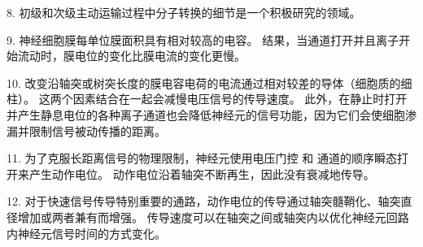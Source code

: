 8. 初级和次级主动运输过程中分子转换的细节是一个积极研究的领域。


9. 神经细胞膜每单位膜面积具有相对较高的电容。
结果，当通道打开并且离子开始流动时，膜电位的变化比膜电流的变化更慢。


10. 改变沿轴突或树突长度的膜电容电荷的电流通过相对较差的导体（细胞质的细柱）。
这两个因素结合在一起会减慢电压信号的传导速度。
此外，在静止时打开并产生静息电位的各种离子通道也会降低神经元的信号功能，因为它们会使细胞渗漏并限制信号被动传播的距离。 


11. 为了克服长距离信号的物理限制，神经元使用电压门控  和  通道的顺序瞬态打开来产生动作电位。
动作电位沿着轴突不断再生，因此没有衰减地传导。 


12. 对于快速信号传导特别重要的通路，动作电位的传导通过轴突髓鞘化、轴突直径增加或两者兼有而增强。
传导速度可以在轴突之间或轴突内以优化神经元回路内神经元信号时间的方式变化。









